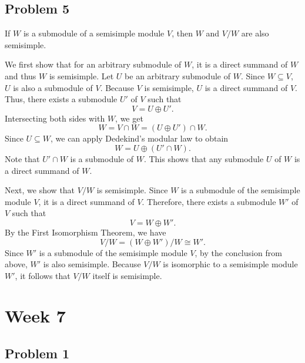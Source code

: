 \subsection*{Problem 5}
If $W$ is a submodule of a semisimple module $V$, then $W$ and $V/W$ are also semisimple.
\begin{solution}
    We first show that for an arbitrary submodule of $W$, it is a direct summand of $W$ and thus $W$ is semisimple.
    Let $U$ be an arbitrary submodule of $W$. 
    Since $W \subseteq V$, $U$ is also a submodule of $V$. 
    Because $V$ is semisimple, $U$ is a direct summand of $V$. 
    Thus, there exists a submodule $U'$ of $V$ such that
$$V = U \oplus U'.$$
Intersecting both sides with $W$, we get
$$W = V \cap W = (U \oplus U') \cap W.$$
Since $U \subseteq W$, we can apply Dedekind's modular law to obtain
$$W = U \oplus (U' \cap W).$$
Note that $U' \cap W$ is a submodule of $W$. This shows that any submodule $U$ of $W$ is a direct summand of $W$.

Next, we show that $V/W$ is semisimple.
Since $W$ is a submodule of the semisimple module $V$, it is a direct summand of $V$. Therefore, there exists a submodule $W'$ of $V$ such that
$$V = W \oplus W'.$$
By the First Isomorphism Theorem, we have
$$V/W = (W \oplus W')/W \cong W'.$$
Since $W'$ is a submodule of the semisimple module $V$, by the conclusion from above, $W'$ is also semisimple. Because $V/W$ is isomorphic to a semisimple module $W'$, it follows that $V/W$ itself is semisimple. 
\end{solution}

\section{Week 7}
\subsection*{Problem 1}

